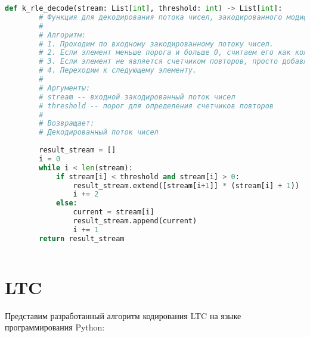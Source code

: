 \begin{lstlisting}[language=python, caption=K-RLE реализация на языке Python, captionpos=b, frame=single]
    def k_rle_decode(stream: List[int], threshold: int) -> List[int]:
        # Функция для декодирования потока чисел, закодированного модифицированным RLE алгоритмом.
        #
        # Алгоритм:
        # 1. Проходим по входному закодированному потоку чисел.
        # 2. Если элемент меньше порога и больше 0, считаем его как количество повторов и добавляем соответствующие элементы в результат.
        # 3. Если элемент не является счетчиком повторов, просто добавляем его в результат.
        # 4. Переходим к следующему элементу.
        #
        # Аргументы:
        # stream -- входной закодированный поток чисел
        # threshold -- порог для определения счетчиков повторов
        #
        # Возвращает:
        # Декодированный поток чисел
        
        result_stream = []
        i = 0
        while i < len(stream):
            if stream[i] < threshold and stream[i] > 0:
                result_stream.extend([stream[i+1]] * (stream[i] + 1))
                i += 2
            else:
                current = stream[i]
                result_stream.append(current)
                i += 1
        return result_stream
    
\end{lstlisting}

\section{LTC}

Представим разработанный алгоритм кодирования
LTC на языке программирования Python:

